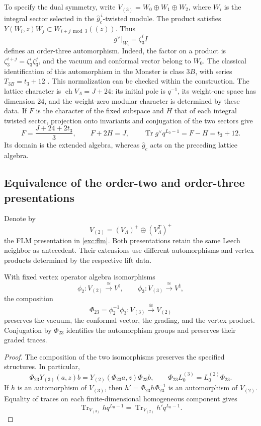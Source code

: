 To specify the dual symmetry, write
\(V_{(3)}=W_0\oplus W_1\oplus W_2\), where \(W_i\) is the
integral sector selected in the \(\widehat g_c^{\,i}\)-twisted module.
The product satisfies
\(Y(W_i,z)W_j\subset W_{i+j\bmod3}((z))\). Thus
\begin{equation}
 g^\vee|_{W_i}=\zeta_3^i I
 \label{km:dual-ciclico}
\end{equation}
defines an order-three automorphism. Indeed, the factor on a product
is \(\zeta_3^{i+j}=\zeta_3^i\zeta_3^j\), and the vacuum and
conformal vector belong to \(W_0\). The classical identification of
this automorphism in the Monster is class \(3B\), with series
\(T_{3B}=t_3+12\) \cite{kmconwaynorton1979,borcherds}.
This normalization can be checked within the construction. The lattice
character is \(\operatorname{ch}V_\Lambda=J+24\): its initial pole
is \(q^{-1}\), its weight-one space has dimension 24, and the
weight-zero modular character is determined by these data.
If \(F\) is the character of the fixed subspace and \(H\) that of
each integral twisted sector, projection onto invariants and conjugation
of the two sectors give
\[
 F=\frac{J+24+2t_3}{3},\qquad F+2H=J,
 \qquad \operatorname{Tr}g^\vee q^{L_0-1}=F-H=t_3+12.
\]
Its domain is the extended algebra, whereas \(\widehat g_c\) acts
on the preceding lattice algebra.

\subsection{Equivalence of the order-two and order-three presentations}
\label{km:equivalencia-dos-tres}

Denote by
\[
 V_{(2)}=(V_\Lambda)^+\oplus(V_\Lambda^T)^+
\]
the FLM presentation in \eqref{exc:flm}. Both presentations retain
the same Leech neighbor as antecedent. Their extensions use different
automorphisms and vertex products determined by the respective lift
data.

\begin{theorem}
\label{km:equivalencia-voa}
With fixed vertex operator algebra isomorphisms
\[
 \phi_2:V_{(2)}\xrightarrow{\ \cong\ }V^\natural,
 \qquad
 \phi_3:V_{(3)}\xrightarrow{\ \cong\ }V^\natural,
\]
the composition
\begin{equation}
 \Phi_{23}=\phi_2^{-1}\phi_3:
 V_{(3)}\xrightarrow{\ \cong\ }V_{(2)}
 \label{km:Phi23}
\end{equation}
preserves the vacuum, the conformal vector, the grading, and the
vertex product. Conjugation by \(\Phi_{23}\) identifies the
automorphism groups and preserves their graded traces.
\end{theorem}
\begin{proof}
The composition of the two isomorphisms preserves the specified
structures. In particular,
\[
 \Phi_{23}Y_{(3)}(a,z)b
 =Y_{(2)}(\Phi_{23}a,z)\Phi_{23}b,
 \qquad
 \Phi_{23}L_0^{(3)}=L_0^{(2)}\Phi_{23}.
\]
If \(h\) is an automorphism of \(V_{(3)}\), then
\(h' =\Phi_{23}h\Phi_{23}^{-1}\) is an automorphism of \(V_{(2)}\).
Equality of traces on each finite-dimensional homogeneous component
gives
\[
 \operatorname{Tr}_{V_{(3)}}h q^{L_0-1}
 =\operatorname{Tr}_{V_{(2)}}h' q^{L_0-1}.
\]
\end{proof}

